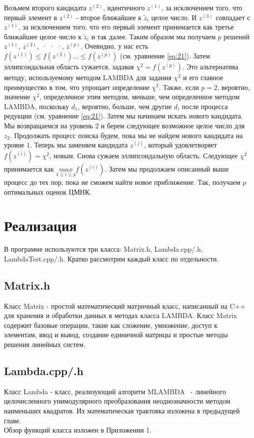 \documentclass[12pt]{matmex-diploma}
\begin{document}
Возьмем второго кандидата $z^{(2)}$, идентичного $z^{(1)}$, за исключением того,
что первый элемент в $z^{(2)}$ - второе ближайшее к $\tilde{z}_i$ целое число.
И $z^{(3)}$ совпадает с $z^{(1)}$, за исключением того, что его первый элемент
принимается как третье ближайшее целое число к $\tilde{z}_i$ и так далее.
Таким образом мы получаем $p$ решений $z^{(1)}$, $z^{(2)}$, · · ·, $z^{(p)}$.
Очевидно, у нас есть $f (z^{(1)}) \leq f (z^{(2)}) ... \leq f (z^{(p)})$ 
(см. уравнение \ref{eq:21}). Затем эллипсоидальная область сужается, задавая
$\chi^2 = f (z^{(p)})$. Это альтернатива методу, используемому методом LAMBDA
для задания $\chi^2$ и его главное преимущество в том, что упрощает определение $\chi^2$.
Также, если $p = 2$, вероятно, значение $\chi^2$, определенное этим методом, меньше,
чем определенное методом LAMBDA, поскольку $d_1$, вероятно, больше, чем другие $d_i$
после процесса редукции (см. уравнение \ref{eq:21}). Затем мы начинаем искать нового
кандидата. Мы возвращаемся на уровень $2$ и берем следующее возможное целое
число для $z_2$. Продолжать процесс поиска будем, пока мы не найдем нового кандидата
на уровне $1$. Теперь мы заменяем кандидата $z^{(j)}$, который удовлетворяет
$f (z^{(i)}) = \chi^2$, новым. Снова сужаем эллипсоидальную область. Следующее $\chi^2$
принимается как $\underset{1 \leq i \leq p}{max}f (z^{(i)})$. Затем мы продолжаем
описанный выше процесс до тех пор, пока не сможем найти новое приближение. 
Так, получаем $p$ оптимальных оценок ЦМНК.

\section{Реализация}
В программе используются три класса: Matrix.h, Lambda.cpp/.h, LambdaTest.cpp/.h. Кратко рассмотрим каждый класс по отдельности.
\subsection{Matrix.h}
Класс Matrix - простой математический матричный класс, написанный на C++ для 
хранения и обработки данных в методах класса LAMBDA. Класс Matrix содержит 
базовые операции, такие как сложение, умножение, доступ к элементам, ввод и вывод, 
создание единичной матрицы и простые методы решения линейных систем. 

\subsection{Lambda.cpp/.h}
Класс Lambda - класс, реализующий алгоритм MLAMBDA~\cite{article:mlambda} - 
линейного целочисленного унимодулярного преобразования неоднозначности методом 
наименьших квадратов. Их математическая трактовка изложена в предыдущей главе. \\ 
Обзор функций класса изложен в Приложении 1.
\end{document}
